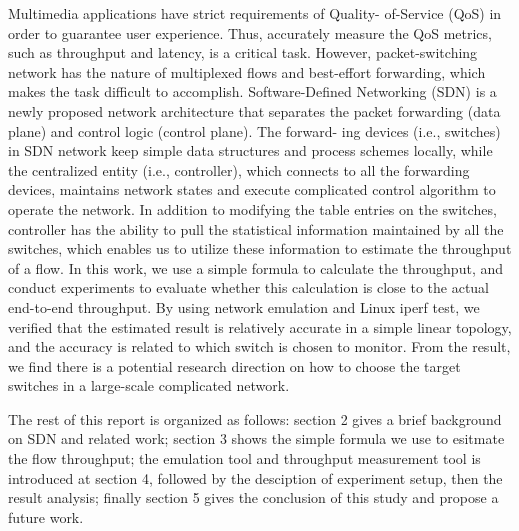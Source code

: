 \documentclass[12pt]{article}
\begin{document}
Multimedia applications have strict requirements of Quality-
of-Service (QoS) in order to guarantee user experience. Thus,
accurately measure the QoS metrics, such as throughput
and latency, is a critical task. However, packet-switching
network has the nature of multiplexed flows and best-effort
forwarding, which makes the task difficult to accomplish.
Software-Defined Networking (SDN) \cite{SDN} is a newly proposed
network architecture that separates the packet forwarding
(data plane) and control logic (control plane). The forward-
ing devices (i.e., switches) in SDN network keep simple data
structures and process schemes locally, while the centralized
entity (i.e., controller), which connects to all the forwarding
devices, maintains network states and execute complicated
control algorithm to operate the network. In addition to modifying the table entries on the switches, controller has the ability to pull the statistical information maintained by all the switches, which enables us to utilize these information to estimate the throughput of a flow. In this work, we use a simple formula to calculate the throughput, and conduct experiments to evaluate whether this calculation is close to the actual end-to-end throughput. By using network emulation and Linux iperf test, we verified that the estimated result is relatively accurate in a simple linear topology, and the accuracy is related to which switch is chosen to monitor. From the result, we find there is a potential research direction on how to choose the target switches in a large-scale complicated network.

The rest of this report is organized as follows: section 2 gives a brief background on SDN and related work; section 3 shows the simple formula we use to esitmate the flow throughput; the emulation tool and throughput measurement tool is introduced at section 4, followed by the desciption of experiment setup, then the result analysis; finally section 5 gives the conclusion of this study and propose a future work.
\end{document}
